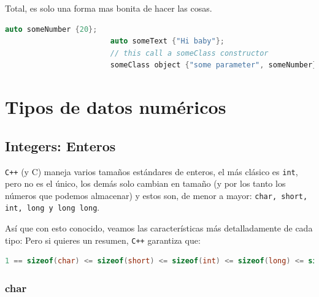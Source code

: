 \documentclass[12pt, fleqn]{report}                             %
\theoremstyle{break}                                            %
\newcommand \Cpp  {\texttt{C++} }                               %
\begin{document}
                    Total, es solo una forma mas bonita de hacer las cosas.

                    \begin{lstlisting}[language=C++, gobble=24]
                        auto someNumber {20};   
                        auto someText {"Hi baby"};
                        // this call a someClass constructor
                        someClass object {"some parameter", someNumber};
                    \end{lstlisting}


        \clearpage
        \section{Tipos de datos numéricos}

            \subsection{Integers: Enteros}

                \Cpp (y C) maneja varios tamaños estándares de enteros, el más clásico
                es \texttt{int}, pero no es el único, los demás solo cambian en tamaño
                (y por los tanto los números que podemos almacenar)
                y estos son, de menor a mayor: \texttt{char, short, int, long y long long}.

                Así que con esto conocido, veamos las características más detalladamente de cada tipo:
                Pero si quieres un resumen, \Cpp garantiza que:
                \begin{lstlisting}[language=C++, gobble=20]
                    1 == sizeof(char) <= sizeof(short) <= sizeof(int) <= sizeof(long) <= sizeof(long long);
                \end{lstlisting}


                \subsubsection{char}
\end{document}

